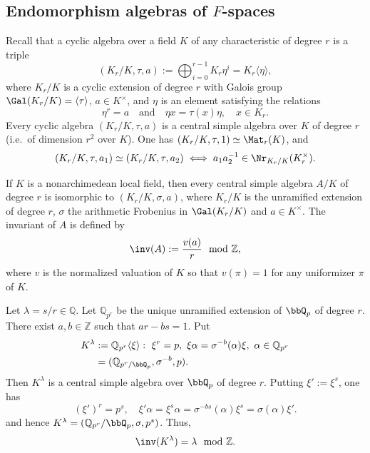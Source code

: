 \documentclass[]{amsart}
\theoremstyle{plain}
\theoremstyle{definition}
\theoremstyle{remark}
\def\Qp{{\bbQ}_p}
\newcommand{\Z}{\mathbb Z}
\newcommand{\Q}{\mathbb Q}
\newcommand{\<}{\langle}   %
\renewcommand{\>}{\rangle} %
\begin{document}
\subsection{Endomorphism algebras of $F$-spaces}

Recall that a cyclic algebra over a field $K$ of any characteristic of degree $r$ is a triple 
\[ (K_r/K, \tau, a):=\bigoplus_{i=0}^{r-1} K_r \eta^i=K_r\<\eta\>, \] 
where 
$K_r/K$ is a cyclic extension of degree $r$ with Galois group $\Gal(K_r/K)=\< \tau \>$, $a\in K^\times$, and $\eta$ is an element satisfying the relations 
\[ \eta^r=a\quad  \text{and} \quad \eta x =\tau(x) \eta, \quad    x\in K_r. \] 
Every cyclic algebra $(K_r/K, \tau, a)$ is a central simple algebra over $K$ of degree $r$ (i.e.~of dimension $r^2$ over $K$). One has $(K_r/K, \tau, 1)\simeq \Mat_r(K)$, and 
\[ (K_r/K, \tau, a_1)\simeq (K_r/K, \tau, a_2) \iff a_1 a_2^{-1} \in \Nr_{K_r/K}(K^\times_r). \]  

If $K$ is a nonarchimedean local field, then every central simple algebra $A/K$ of degree $r$ is isomorphic to $(K_r/K,\sigma, a)$, where $K_r/K$ is the unramified extension of degree $r$, $\sigma$ the arithmetic Frobenius in $\Gal(K_r/K)$ and $a\in K^\times$. The invariant of $A$ is defined by
\[ \inv(A):=\frac{v(a)}{r} \ \ { \rm mod } \ \Z,\]
where $v$ is the normalized valuation of $K$ so that $v(\pi)=1$ for any uniformizer $\pi$ of $K$. 

Let $\lambda=s/r\in \Q$. Let $\Q_{p^r}$ be the unique unramified extension of $\Qp$ of degree $r$. There exist $a,b\in \Z$ such that $ar-bs=1$. Put
\[ \begin{split}
    K^\lambda &:=\Q_{p^r}\<\xi\>: 
     \ \xi^r=p, \ \xi \alpha=\sigma^{-b}(\alpha) \xi, \ \alpha\in \Q_{p^r}
    \\
    &=(\Q_{p^r/\Qp}, \sigma^{-b}, p).
\end{split} \]
Then $K^\lambda$ is a central simple algebra over $\Qp$ of degree $r$. Putting $\xi':=\xi^s$, one has
\[ (\xi')^r=p^s, \quad \xi' \alpha=\xi^s \alpha=\sigma^{-bs}(\alpha) \xi^s= \sigma(\alpha) \xi'. \]
and hence $K^\lambda=(\Q_{p^r}/\Qp, \sigma, p^s)$. Thus, 
\[ \inv(K^\lambda)=\lambda \ \ {\rm mod} \ \Z. \]
\end{document}
